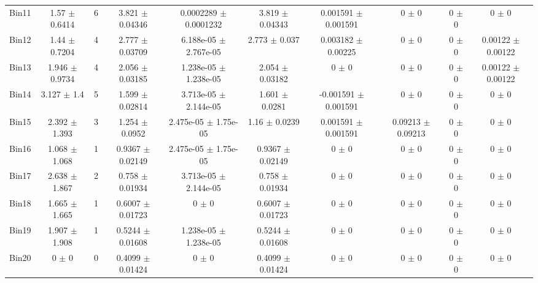 \begin{tabular}{@{\extracolsep{4pt}}lccccccccc@{}}
     Bin11 & 1.57 $\pm$ 0.6414 & 6 & 3.821 $\pm$ 0.04346 & 0.0002289 $\pm$ 0.0001232 & 3.819 $\pm$ 0.04343 & 0.001591 $\pm$ 0.001591 & 0 $\pm$ 0 & 0 $\pm$ 0 & 0 $\pm$ 0 \\ 
     Bin12 & 1.44 $\pm$ 0.7204 & 4 & 2.777 $\pm$ 0.03709 & 6.188e-05 $\pm$ 2.767e-05 & 2.773 $\pm$ 0.037 & 0.003182 $\pm$ 0.00225 & 0 $\pm$ 0 & 0 $\pm$ 0 & 0.00122 $\pm$ 0.00122 \\ 
     Bin13 & 1.946 $\pm$ 0.9734 & 4 & 2.056 $\pm$ 0.03185 & 1.238e-05 $\pm$ 1.238e-05 & 2.054 $\pm$ 0.03182 & 0 $\pm$ 0 & 0 $\pm$ 0 & 0 $\pm$ 0 & 0.00122 $\pm$ 0.00122 \\ 
     Bin14 & 3.127 $\pm$ 1.4 & 5 & 1.599 $\pm$ 0.02814 & 3.713e-05 $\pm$ 2.144e-05 & 1.601 $\pm$ 0.0281 & -0.001591 $\pm$ 0.001591 & 0 $\pm$ 0 & 0 $\pm$ 0 & 0 $\pm$ 0 \\ 
     Bin15 & 2.392 $\pm$ 1.393 & 3 & 1.254 $\pm$ 0.0952 & 2.475e-05 $\pm$ 1.75e-05 & 1.16 $\pm$ 0.0239 & 0.001591 $\pm$ 0.001591 & 0.09213 $\pm$ 0.09213 & 0 $\pm$ 0 & 0 $\pm$ 0 \\ 
     Bin16 & 1.068 $\pm$ 1.068 & 1 & 0.9367 $\pm$ 0.02149 & 2.475e-05 $\pm$ 1.75e-05 & 0.9367 $\pm$ 0.02149 & 0 $\pm$ 0 & 0 $\pm$ 0 & 0 $\pm$ 0 & 0 $\pm$ 0 \\ 
     Bin17 & 2.638 $\pm$ 1.867 & 2 & 0.758 $\pm$ 0.01934 & 3.713e-05 $\pm$ 2.144e-05 & 0.758 $\pm$ 0.01934 & 0 $\pm$ 0 & 0 $\pm$ 0 & 0 $\pm$ 0 & 0 $\pm$ 0 \\ 
     Bin18 & 1.665 $\pm$ 1.665 & 1 & 0.6007 $\pm$ 0.01723 & 0 $\pm$ 0 & 0.6007 $\pm$ 0.01723 & 0 $\pm$ 0 & 0 $\pm$ 0 & 0 $\pm$ 0 & 0 $\pm$ 0 \\ 
     Bin19 & 1.907 $\pm$ 1.908 & 1 & 0.5244 $\pm$ 0.01608 & 1.238e-05 $\pm$ 1.238e-05 & 0.5244 $\pm$ 0.01608 & 0 $\pm$ 0 & 0 $\pm$ 0 & 0 $\pm$ 0 & 0 $\pm$ 0 \\ 
     Bin20 & 0 $\pm$ 0 & 0 & 0.4099 $\pm$ 0.01424 & 0 $\pm$ 0 & 0.4099 $\pm$ 0.01424 & 0 $\pm$ 0 & 0 $\pm$ 0 & 0 $\pm$ 0 & 0 $\pm$ 0 \\ 
\hline\hline
  \end{tabular}
